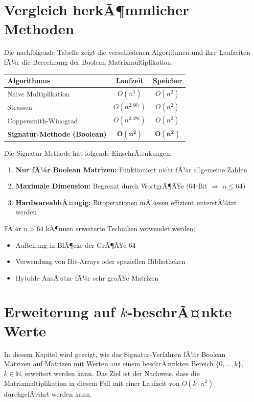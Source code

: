 ﻿\documentclass[a4paper,12pt]{article}
\theoremstyle{definition}
\begin{document}
\section{Vergleich herkÃ¶mmlicher Methoden}
Die nachfolgende Tabelle zeigt die verschiedenen Algorithmen und ihre Laufzeiten fÃ¼r die Berechnung der Boolean Matrixmultiplikation.
\begin{center}
	\begin{tabular}{|l|c|c|}
		\hline
		\textbf{Algorithmus} & \textbf{Laufzeit} & \textbf{Speicher} \\
		\hline
		Naive Multiplikation & $O(n^3)$ & $O(n^2)$ \\
		Strassen & $O(n^{2.807})$ & $O(n^2)$ \\
		Coppersmith-Winograd & $O(n^{2.376})$ & $O(n^2)$ \\
		\hline
		\textbf{Signatur-Methode (Boolean)} & $\mathbf{O(n^2)}$ & $\mathbf{O(n^2)}$ \\
		\hline
	\end{tabular}
\end{center}
Die Signatur-Methode hat folgende EinschrÃ¤nkungen:

\begin{enumerate}
	\item \textbf{Nur fÃ¼r Boolean Matrizen:} Funktioniert nicht fÃ¼r allgemeine Zahlen
	\item \textbf{Maximale Dimension:} Begrenzt durch WortgrÃ¶ÃŸe (64-Bit $\Rightarrow$ $n \leq 64$)
	\item \textbf{HardwareabhÃ¤ngig:} Bitoperationen mÃ¼ssen effizient unterstÃ¼tzt werden
\end{enumerate}
FÃ¼r $n > 64$ kÃ¶nnen erweiterte Techniken verwendet werden:
\begin{itemize}
	\item[-] Aufteilung in BlÃ¶cke der GrÃ¶ÃŸe 64
	\item[-] Verwendung von Bit-Arrays oder speziellen Bibliotheken
	\item[-] Hybride AnsÃ¤tze fÃ¼r sehr groÃŸe Matrizen
\end{itemize}

\section{Erweiterung auf $k$-beschrÃ¤nkte Werte}

In diesem Kapitel wird gezeigt, wie das Signatur-Verfahren fÃ¼r Boolean Matrizen auf Matrizen mit Werten aus einem beschrÃ¤nkten Bereich $\{0, \dots, k\}$, $k \in \mathbb{N}$, erweitert werden kann. Das Ziel ist der Nachweis, dass die Matrixmultiplikation in diesem Fall mit einer Laufzeit von $O(k \cdot n^2)$ durchgefÃ¼hrt werden kann.
\end{document}
